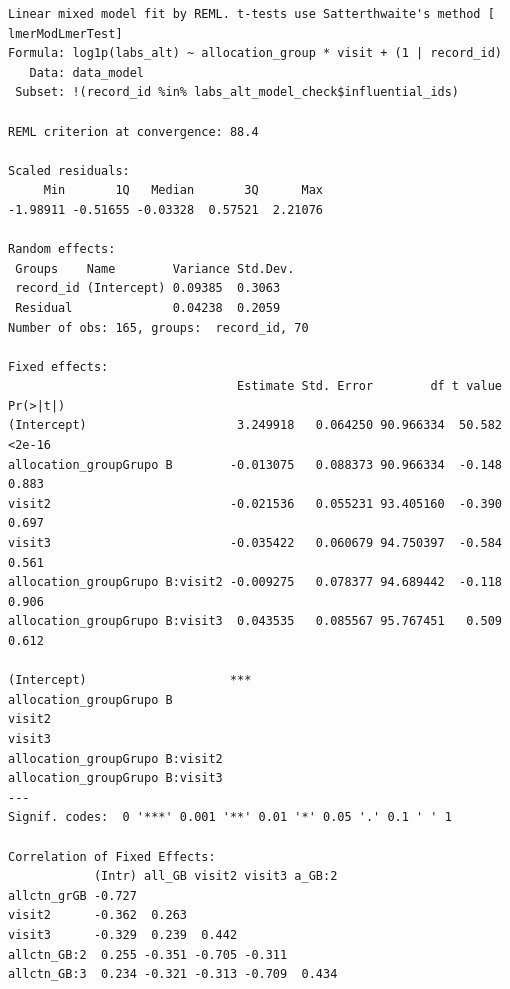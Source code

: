 \documentclass[
  letterpaper,
  DIV=11,
  numbers=noendperiod]{scrartcl}
\newenvironment{Shaded}{\begin{snugshade}}{\end{snugshade}}
\newcommand{\NormalTok}[1]{\textcolor[rgb]{0.00,0.23,0.31}{#1}}
\newcommand{\SpecialCharTok}[1]{\textcolor[rgb]{0.37,0.37,0.37}{#1}}
\begin{document}
\begin{verbatim}
Linear mixed model fit by REML. t-tests use Satterthwaite's method [
lmerModLmerTest]
Formula: log1p(labs_alt) ~ allocation_group * visit + (1 | record_id)
   Data: data_model
 Subset: !(record_id %in% labs_alt_model_check$influential_ids)

REML criterion at convergence: 88.4

Scaled residuals: 
     Min       1Q   Median       3Q      Max 
-1.98911 -0.51655 -0.03328  0.57521  2.21076 

Random effects:
 Groups    Name        Variance Std.Dev.
 record_id (Intercept) 0.09385  0.3063  
 Residual              0.04238  0.2059  
Number of obs: 165, groups:  record_id, 70

Fixed effects:
                                Estimate Std. Error        df t value Pr(>|t|)
(Intercept)                     3.249918   0.064250 90.966334  50.582   <2e-16
allocation_groupGrupo B        -0.013075   0.088373 90.966334  -0.148    0.883
visit2                         -0.021536   0.055231 93.405160  -0.390    0.697
visit3                         -0.035422   0.060679 94.750397  -0.584    0.561
allocation_groupGrupo B:visit2 -0.009275   0.078377 94.689442  -0.118    0.906
allocation_groupGrupo B:visit3  0.043535   0.085567 95.767451   0.509    0.612
                                  
(Intercept)                    ***
allocation_groupGrupo B           
visit2                            
visit3                            
allocation_groupGrupo B:visit2    
allocation_groupGrupo B:visit3    
---
Signif. codes:  0 '***' 0.001 '**' 0.01 '*' 0.05 '.' 0.1 ' ' 1

Correlation of Fixed Effects:
            (Intr) all_GB visit2 visit3 a_GB:2
allctn_grGB -0.727                            
visit2      -0.362  0.263                     
visit3      -0.329  0.239  0.442              
allctn_GB:2  0.255 -0.351 -0.705 -0.311       
allctn_GB:3  0.234 -0.321 -0.313 -0.709  0.434
\end{verbatim}

\begin{Shaded}
\end{Shaded}
\end{document}
